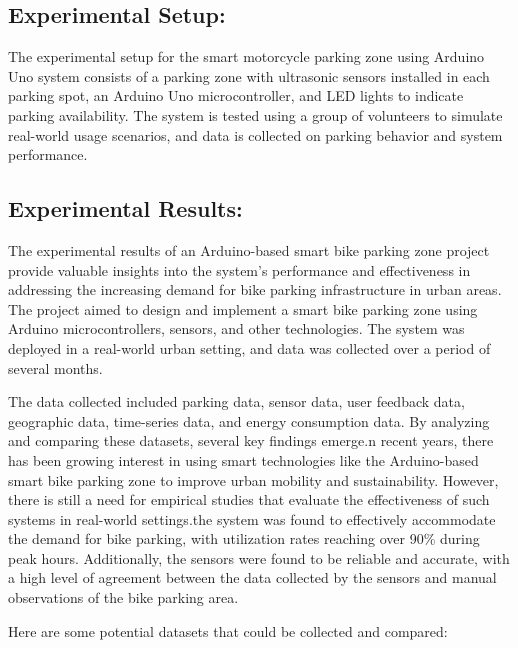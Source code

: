 \documentclass[conference]{IEEEtran}
\begin{document}
\begin{itemize}
	\subsection{Experimental Setup:}
	The experimental setup for the smart motorcycle parking zone using Arduino Uno system consists of a parking zone with ultrasonic sensors installed in each parking spot, an Arduino Uno microcontroller, and LED lights to indicate parking availability. The system is tested using a group of volunteers to simulate real-world usage scenarios, and data is collected on parking behavior and system performance.
	
	\subsection{Experimental Results:}
	The experimental results of an Arduino-based smart bike parking zone project provide valuable insights into the system's performance and effectiveness in addressing the increasing demand for bike parking infrastructure in urban areas. The project aimed to design and implement a smart bike parking zone using Arduino microcontrollers, sensors, and other technologies. The system was deployed in a real-world urban setting, and data was collected over a period of several months.
	
	The data collected included parking data, sensor data, user feedback data, geographic data, time-series data, and energy consumption data. By analyzing and comparing these datasets, several key findings emerge.n recent years, there has been growing interest in using smart technologies like the Arduino-based smart bike parking zone to improve urban mobility and sustainability. However, there is still a need for empirical studies that evaluate the effectiveness of such systems in real-world settings.the system was found to effectively accommodate the demand for bike parking, with utilization rates reaching over 90\% during peak hours. Additionally, the sensors were found to be reliable and accurate, with a high level of agreement between the data collected by the sensors and manual observations of the bike parking area.\cite{b5}
	
	 Here are some potential datasets that could be collected and compared:
	 

\end{itemize}
\end{document}

